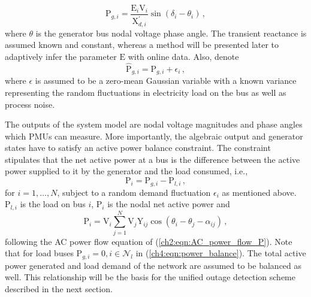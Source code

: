 \begin{equation}
\label{ch4:eqn:ae_continuous}
\text{P}_{g, i} = \frac{\text{E}_i\text{V}_i}{\text{X}_{d, i}^{'}}\sin (\delta_i - \theta_i)\,,
\end{equation}
where $\theta$ is the generator bus nodal voltage phase angle. The transient reactance is assumed known and constant, whereas a method will be presented later to adaptively infer the parameter $\text{E}$ with online data. Also, denote 
$$
\hat{\text{P}}_{g, i} = \text{P}_{g, i} + \epsilon_i \,,
$$
where $\epsilon$ is assumed to be a zero-mean Gaussian variable with a known variance representing the random fluctuations in electricity load on the bus as well as process noise. 

The outputs of the system model are nodal voltage magnitudes and phase angles which PMUs can measure. More importantly, the algebraic output and generator states have to satisfy an active power balance constraint. The constraint stipulates that the net active power at a bus is the difference between the active power supplied to it by the generator and the load consumed, i.e.,
\begin{equation}
\label{ch4:eqn:power_balance}
\text{P}_i = \text{P}_{g, i} - \text{P}_{l, i} \,,
\end{equation}
for $i = 1, \dots, N$, subject to a random demand fluctuation $\epsilon_i$ as mentioned above. $\text{P}_{l, i}$ is the load on bus $i$, $\text{P}_{i}$ is the nodal net active power and 
\begin{equation}
\label{ch4:eqn:ac_pf}
\text{P}_{i} = \text{V}_i \sum_{j=1}^{N} \text{V}_j \text{Y}_{ij} \cos (\theta_i - \theta_j - \alpha_{ij}) \,,
\end{equation} following the AC power flow equation of (\ref{ch2:eqn:AC_power_flow_P}). Note that for load buses $\text{P}_{g, i} = 0, i \in \mathcal{N}_l$ in (\ref{ch4:eqn:power_balance}). The total active power generated and load demand of the network are assumed to be balanced as well. This relationship will be the basis for the unified outage detection scheme described in the next section. 

